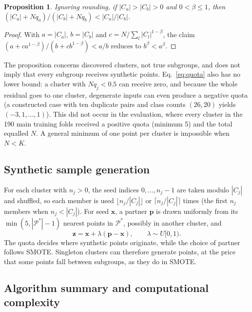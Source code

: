 \documentclass[preprint,nopreprintline]{elsarticle}
\theoremstyle{plain}
\newtheorem{proposition}{Proposition}
\theoremstyle{definition}
\begin{document}
\begin{proposition}\label{prop:ratio}
Ignoring rounding, if $|C_a|>|C_b|>0$ and $0<\beta\le1$, then $(|C_a|+Nq_a)/(|C_b|+Nq_b)<|C_a|/|C_b|$.
\end{proposition}

\begin{proof}
With $a=|C_a|$, $b=|C_b|$ and $c=N/\sum_l|C_l|^{1-\beta}$, the claim $(a+ca^{1-\beta})/(b+cb^{1-\beta})<a/b$ reduces to $b^{\beta}<a^{\beta}$.
\end{proof}

The proposition concerns discovered clusters, not true subgroups, and does not imply that every subgroup receives synthetic points. Eq.~\eqref{eq:quota} also has no lower bound: a cluster with $Nq_j<0.5$ can receive zero, and because the whole residual goes to one cluster, degenerate inputs can even produce a negative quota (a constructed case with ten duplicate pairs and class counts $(26,20)$ yields $(-3,1,\dots,1)$). This did not occur in the evaluation, where every cluster in the 190 main training folds received a positive quota (minimum 5) and the total equalled $N$. A general minimum of one point per cluster is impossible when $N<K$.

\subsection{Synthetic sample generation}\label{sec:generation}

For each cluster with $n_j>0$, the seed indices $0,\dots,n_j-1$ are taken modulo $|C_j|$ and shuffled, so each member is used $\lfloor n_j/|C_j|\rfloor$ or $\lceil n_j/|C_j|\rceil$ times (the first $n_j$ members when $n_j<|C_j|$). For seed $\mathbf{x}$, a partner $\mathbf{p}$ is drawn uniformly from its $\min(5,|\mathcal{P}^{*}|-1)$ nearest points in $\mathcal{P}^{*}$, possibly in another cluster, and
\begin{equation}\label{eq:interp}
\mathbf{z}=\mathbf{x}+\lambda(\mathbf{p}-\mathbf{x}),\qquad\lambda\sim U[0,1).
\end{equation}
The quota decides where synthetic points originate, while the choice of partner follows SMOTE. Singleton clusters can therefore generate points, at the price that some points fall between subgroups, as they do in SMOTE.

\subsection{Algorithm summary and computational complexity}\label{sec:algorithm}
\end{document}
